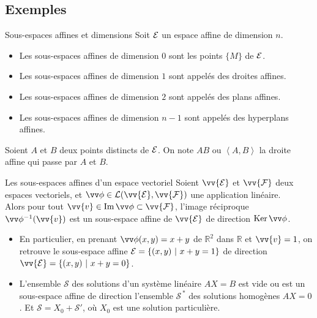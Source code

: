 \documentclass[
bigger]{m53beamer}
\begin{document}
\subsection{Exemples}
  \begin{frame}{Sous-espaces affines et dimensions}
    Soit $\mathcal{E}$ un espace affine de dimension $n$.
    \begin{itemize}[<+(1)->]
      \item Les sous-espaces affines de dimension $0$ sont les points $\{M\}$ de $\mathcal{E}$.
      \item Les sous-espaces affines de dimension $1$ sont appelés \alert{des droites affines}.
      \item Les sous-espaces affines de dimension $2$ sont appelés \alert{des plans affines}.
      \item Les sous-espaces affines de dimension $n-1$ sont appelés \alert{des hyperplans affines}.
    \end{itemize}\pause

    Soient $A$ et $B$ deux points distincts de $\mathcal{E}$. On note $AB$ ou $\left<A,B\right>$ la droite affine qui passe par $A$ et $B$.
  \end{frame}
  \begin{frame}{Les sous-espaces affines d'un espace vectoriel}
    Soient $\vv{\ens{E}}$ et $\vv{\ens{F}}$ deux espaces vectoriels, et $\vv\phi \in \mathcal{L}(\vv{\ens{E}},\vv{\ens{F}})$ une application linéaire.\pause\\
    Alors pour tout $\vv{v}\in\im\vv\phi\subset\vv{\ens{F}}$, l'image réciproque $\vv\phi^{-1}(\vv{v})$ est un sous-espace affine de $\vv{\ens{E}}$ de direction $\ker{\vv\phi}$.
    \begin{itemize}[<+(1)->]
      \item En particulier, en prenant $\vv\phi(x,y)=x+y$ de $\mathbb{R}^{2}$ dans $\mathbb{R}$ et $\vv{v}=1$, on retrouve le sous-espace affine $\mathcal{E}=\{(x,y)\ |\ x+y=1 \}$ de direction $\vv{\ens{E}}=\{(x,y)\ |\ x+y=0 \}$.
      \item L'ensemble $\mathcal{S}$ des solutions d'un système linéaire $AX=B$ est vide ou est un sous-espace affine de direction l'ensemble $\mathcal{S^{\,\ast}}$ des solutions homogènes $AX=0$. Et $\mathcal{S}=X_{0}+\mathcal{S}'$, où $X_{0}$ est une solution particulière.
    \end{itemize}
  \end{frame}
\end{document}
